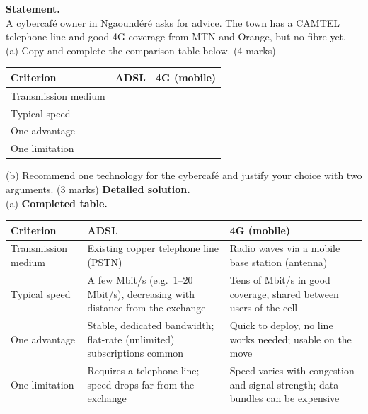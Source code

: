 \documentclass[11pt]{article}
\begin{document}
\begin{exoresolu}
\textbf{Statement.}\\
A cybercafé owner in Ngaoundéré asks for advice. The town has a CAMTEL telephone line and good 4G coverage from MTN and Orange, but no fibre yet.\\
(a) Copy and complete the comparison table below. \hfill (4 marks)
\begin{center}
\begin{tabularx}{\linewidth}{|l|X|X|}
\hline
\rowcolor{popblueL} \textbf{Criterion} & \textbf{ADSL} & \textbf{4G (mobile)} \\
\hline
Transmission medium & & \\
\hline
Typical speed & & \\
\hline
One advantage & & \\
\hline
One limitation & & \\
\hline
\end{tabularx}
\end{center}
(b) Recommend one technology for the cybercafé and justify your choice with two arguments. \hfill (3 marks)
\tcblower
\textbf{Detailed solution.}\\
(a) \textbf{Completed table.}
\begin{center}
\begin{tabularx}{\linewidth}{|l|X|X|}
\hline
\rowcolor{popblueL} \textbf{Criterion} & \textbf{ADSL} & \textbf{4G (mobile)} \\
\hline
Transmission medium & Existing copper telephone line (PSTN) & Radio waves via a mobile base station (antenna) \\
\hline
Typical speed & A few Mbit/s (e.g.\ 1--20 Mbit/s), decreasing with distance from the exchange & Tens of Mbit/s in good coverage, shared between users of the cell \\
\hline
One advantage & Stable, dedicated bandwidth; flat-rate (unlimited) subscriptions common & Quick to deploy, no line works needed; usable on the move \\
\hline
One limitation & Requires a telephone line; speed drops far from the exchange & Speed varies with congestion and signal strength; data bundles can be expensive \\
\hline
\end{tabularx}
\end{center}


\end{exoresolu}
\end{document}
